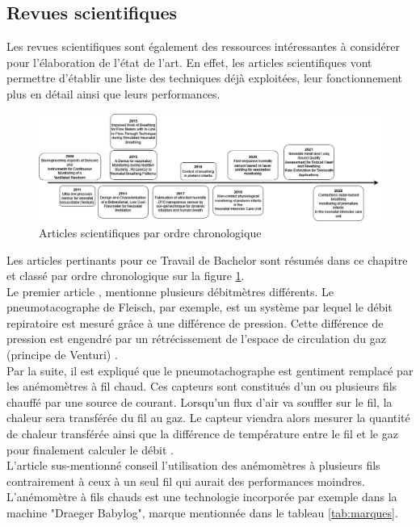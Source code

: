 \subsection{Revues scientifiques}
Les revues scientifiques sont également des ressources intéressantes à considérer pour l'élaboration de l'état de l'art. En effet, les 
articles scientifiques vont permettre d'établir une liste des techniques déjà exploitées, leur fonctionnement plus en détail ainsi que leurs 
performances. \\
\begin{figure}[H]
    \hspace{-1cm}
    \includegraphics[scale = 0.45]{images/DRP_Etat_de_l_art.png}
    \caption{Articles scientifiques par ordre chronologique}
    \label{fig:articlesChrono}
\end{figure}

Les articles pertinants pour ce Travail de Bachelor sont résumés dans ce chapitre et classé par ordre chronologique sur la figure 
\ref{fig:articlesChrono}. \\

Le premier article \cite{rolfe_bioengineering_2009}, mentionne plusieurs débitmètres différents. Le pneumotacographe de Fleisch, par exemple, est un 
système par lequel le débit repiratoire est mesuré grâce à une différence de pression. Cette différence de pression est engendré par 
un rétrécissement de l'espace de circulation du gaz (principe de Venturi) \cite{oberg_biomedical_2011}. \\

Par la suite, il est expliqué que le pneumotachographe est gentiment remplacé par les anémomètres à fil chaud. Ces capteurs sont 
constitués d'un ou plusieurs fils chauffé par une source de courant. Lorsqu'un flux d'air va souffler sur le fil, la chaleur sera 
transférée du fil au gaz. Le capteur viendra alors mesurer la quantité de chaleur transférée ainsi que la différence de température entre 
le fil et le gaz pour finalement calculer le débit \cite{oberg_biomedical_2011}. \\
L'article sus-mentionné conseil l'utilisation des anémomètres à plusieurs fils contrairement à ceux à un seul fil qui aurait des performances 
moindres. 
L'anémomètre à fils chauds est une technologie incorporée par exemple dans la machine "Draeger Babylog", marque mentionnée dans le tableau \ref{tab:marques}. \\

